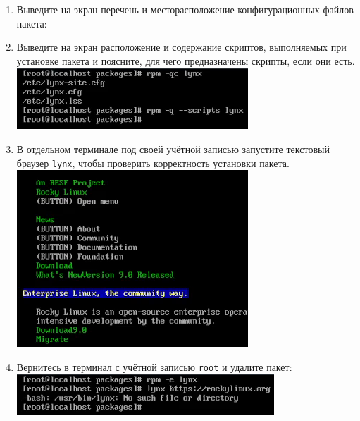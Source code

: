 \documentclass[12pt]{article}
\begin{document}
\begin{enumerate}
	\item Выведите на экран перечень и месторасположение конфигурационных файлов пакета:
	\item Выведите на экран расположение и содержание скриптов, выполняемых при установке пакета и поясните, для чего предназначены скрипты, если они есть.
	      \\\includegraphics{10.png}
	\item В отдельном терминале под своей учётной записью запустите текстовый браузер \texttt{lynx}, чтобы проверить корректность установки пакета.
	      \\\includegraphics{11.png}
	\item Вернитесь в терминал с учётной записью \texttt{root} и удалите пакет:
	      \\\includegraphics{12.png}
\end{enumerate}
\end{document}
